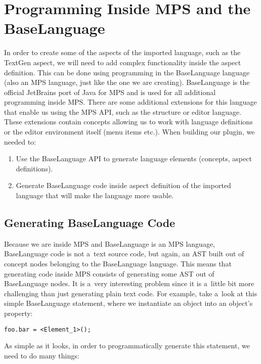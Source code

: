 \section{Programming Inside MPS and the BaseLanguage}
\label{chap:generating_code_inside_mps}

In order to create some of the aspects of the imported language, such as the TextGen aspect, we will need to add complex functionality inside the aspect definition.
This can be done using programming in the BaseLanguage language (also an MPS language, just like the one we are creating).
BaseLanguage is the official JetBrains port of Java for MPS and is used for all additional programming inside MPS.
There are some additional extensions for this language that enable us using the MPS API, such as the structure or editor language.
These extensions contain concepts allowing us to work with language definitions or the editor environment itself (menu items etc.).
When building our plugin, we needed to:

\begin{enumerate}
	\item Use the BaseLanguage API to generate language elements (concepts, aspect definitions).

	\item Generate BaseLanguage code inside aspect definition of the imported language that will make the language more usable.
\end{enumerate}

\subsection{Generating BaseLanguage Code}

Because we are inside MPS and BaseLanguage is an MPS language, BaseLanguage code is not a~text source code, but again, an AST built out of concept nodes belonging to the BaseLanguage language.
This means that generating code inside MPS consists of generating some AST out of BaseLanguage nodes.
It is a~very interesting problem since it is a~little bit more challenging than just generating plain text code.
For example, take a~look at this simple BaseLanguage statement, where we instantiate an object into an object's property:

\begin{center}
	\texttt{foo.bar = <Element{\_}1>();}
\end{center}

\noindent
As simple as it looks, in order to programmatically generate this statement, we need to do many things:

